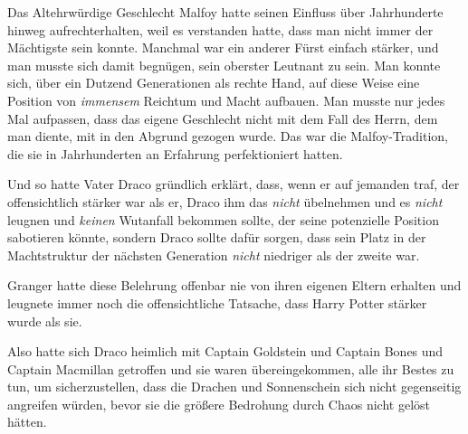 Das Altehrwürdige Geschlecht Malfoy hatte seinen Einfluss über Jahrhunderte hinweg aufrechterhalten, weil es verstanden hatte, dass man nicht immer der Mächtigste sein konnte. Manchmal war ein anderer Fürst einfach stärker, und man musste sich damit begnügen, sein oberster Leutnant zu sein. Man konnte sich, über ein Dutzend Generationen als rechte Hand, auf diese Weise eine Position von \emph{immensem} Reichtum und Macht aufbauen. Man musste nur jedes Mal aufpassen, dass das eigene Geschlecht nicht mit dem Fall des Herrn, dem man diente, mit in den Abgrund gezogen wurde. Das war die Malfoy-Tradition, die sie in Jahrhunderten an Erfahrung perfektioniert hatten.

Und so hatte Vater Draco gründlich erklärt, dass, wenn er auf jemanden traf, der offensichtlich stärker war als er, Draco ihm das \emph{nicht} übelnehmen und es \emph{nicht} leugnen und \emph{keinen} Wutanfall bekommen sollte, der seine potenzielle Position sabotieren könnte, sondern Draco sollte dafür sorgen, dass sein Platz in der Machtstruktur der nächsten Generation \emph{nicht} niedriger als der zweite war.

Granger hatte diese Belehrung offenbar nie von ihren eigenen Eltern erhalten und leugnete immer noch die offensichtliche Tatsache, dass Harry Potter stärker wurde als sie.

Also hatte sich Draco heimlich mit Captain Goldstein und Captain Bones und Captain Macmillan getroffen und sie waren übereingekommen, alle ihr Bestes zu tun, um sicherzustellen, dass die Drachen und Sonnenschein sich nicht gegenseitig angreifen würden, bevor sie die größere Bedrohung durch Chaos nicht gelöst hätten.

